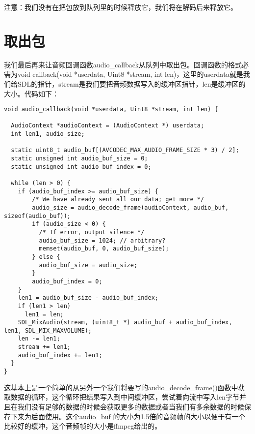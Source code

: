 注意：我们没有在把包放到队列里的时候释放它，我们将在解码后来释放它。

\section{取出包}

我们最后再来让音频回调函数audio_callback从队列中取出包。回调函数的格式必需为void callback(void *userdata, Uint8 *stream, int len)，这里的userdata就是我们给SDL的指针，stream是我们要把音频数据写入的缓冲区指针，len是缓冲区的大小。代码如下：

\begin{lstlisting}
void audio_callback(void *userdata, Uint8 *stream, int len) {

  AudioContext *audioContext = (AudioContext *) userdata;
  int len1, audio_size;

  static uint8_t audio_buf[(AVCODEC_MAX_AUDIO_FRAME_SIZE * 3) / 2];
  static unsigned int audio_buf_size = 0;
  static unsigned int audio_buf_index = 0;

  while (len > 0) {
    if (audio_buf_index >= audio_buf_size) {
        /* We have already sent all our data; get more */
        audio_size = audio_decode_frame(audioContext, audio_buf, sizeof(audio_buf));
        if (audio_size < 0) {
          /* If error, output silence */
          audio_buf_size = 1024; // arbitrary?
          memset(audio_buf, 0, audio_buf_size);
        } else {
          audio_buf_size = audio_size;
        }
        audio_buf_index = 0;
    }
    len1 = audio_buf_size - audio_buf_index;
    if (len1 > len)
      len1 = len;
    SDL_MixAudio(stream, (uint8_t *) audio_buf + audio_buf_index, len1, SDL_MIX_MAXVOLUME);
    len -= len1;
    stream += len1;
    audio_buf_index += len1;
  }
}
\end{lstlisting}

这基本上是一个简单的从另外一个我们将要写的audio_decode_frame()函数中获取数据的循环，这个循环把结果写入到中间缓冲区，尝试着向流中写入len字节并且在我们没有足够的数据的时候会获取更多的数据或者当我们有多余数据的时候保存下来为后面使用。这个audio_buf 的大小为1.5倍的音频帧的大小以便于有一个比较好的缓冲，这个音频帧的大小是ffmpeg给出的。

